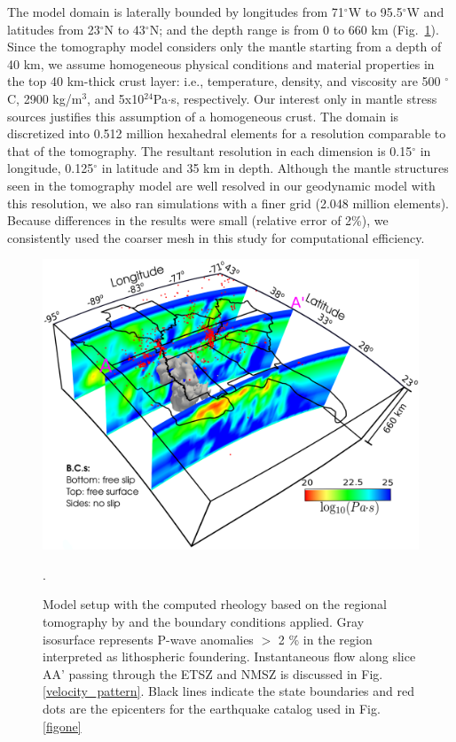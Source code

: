 \documentclass[draft,linenumbers]{agujournal2018}
\begin{document}
     The model domain is laterally bounded by longitudes from 71$^{\circ}$W to 95.5$^{\circ}$W and latitudes from 23$^{\circ}$N to 43$^{\circ}$N; and the depth range is from 0 to 660 km (Fig.~\ref{fig_model}). Since the tomography model considers only the mantle starting from a depth of 40 km, we assume homogeneous physical conditions and material properties in the top 40 km-thick crust layer: i.e., temperature, density, and viscosity are 500 $^{\circ}$C, 2900 kg/m$^{3}$, and 5x10$^{24}$Pa$\cdot$s, respectively. Our interest only in mantle stress sources justifies this assumption of a homogeneous crust. The domain is discretized into 0.512 million hexahedral elements for a resolution comparable to that of the tomography. The resultant resolution in each dimension is 0.15$^{\circ}$ in longitude, 0.125$^{\circ}$ in latitude and 35 km in depth. Although the mantle structures seen in the tomography model are well resolved in our geodynamic model with this resolution, we also ran simulations with a finer grid (2.048 million elements). Because differences in the results were small (relative error of 2\%), we consistently used the coarser mesh in this study for computational efficiency.
%
\begin{figure}[ht]
    \centering
    \includegraphics[width=0.75\linewidth]{figures/model_figure.png}
    \caption{Model setup with the computed rheology based on the regional tomography by \citet{Biryol_2016} and the boundary conditions applied. Gray isosurface represents P-wave anomalies $>$ 2 \% in the region interpreted as lithospheric foundering. Instantaneous flow along slice AA' passing through the ETSZ and NMSZ is discussed in Fig. \ref{velocity_pattern}. Black lines indicate the state boundaries and red dots are the epicenters for the earthquake catalog used in Fig. \ref{figone}}.
    \label{fig_model}
 \end{figure}
    
\end{document}
